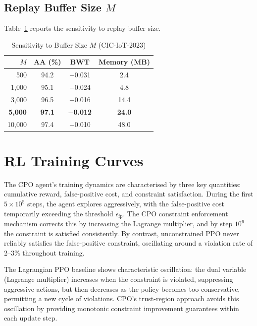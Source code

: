 \documentclass[journal]{IEEEtran}
\begin{document}
\subsection{Replay Buffer Size $M$}

Table~\ref{tab:buffer_sensitivity} reports the sensitivity to replay buffer size.

\begin{table}[!t]
\centering
\caption{Sensitivity to Buffer Size $M$ (CIC-IoT-2023)}
\label{tab:buffer_sensitivity}
\begin{tabular}{@{}rccc@{}}
\toprule
$M$ & \textbf{AA (\%)} & \textbf{BWT} & \textbf{Memory (MB)} \\
\midrule
500 & 94.2 & $-$0.031 & 2.4 \\
1{,}000 & 95.1 & $-$0.024 & 4.8 \\
3{,}000 & 96.5 & $-$0.016 & 14.4 \\
\textbf{5{,}000} & \textbf{97.1} & \textbf{$-$0.012} & \textbf{24.0} \\
10{,}000 & 97.4 & $-$0.010 & 48.0 \\
\bottomrule
\end{tabular}
\end{table}

\section{RL Training Curves}

The CPO agent's training dynamics are characterised by three key quantities: cumulative reward, false-positive cost, and constraint satisfaction. During the first $5\times10^5$ steps, the agent explores aggressively, with the false-positive cost temporarily exceeding the threshold $\epsilon_{\mathrm{fp}}$. The CPO constraint enforcement mechanism corrects this by increasing the Lagrange multiplier, and by step $10^6$ the constraint is satisfied consistently. By contrast, unconstrained PPO never reliably satisfies the false-positive constraint, oscillating around a violation rate of 2--3\% throughout training.

The Lagrangian PPO baseline shows characteristic oscillation: the dual variable (Lagrange multiplier) increases when the constraint is violated, suppressing aggressive actions, but then decreases as the policy becomes too conservative, permitting a new cycle of violations. CPO's trust-region approach avoids this oscillation by providing monotonic constraint improvement guarantees within each update step.
\end{document}
